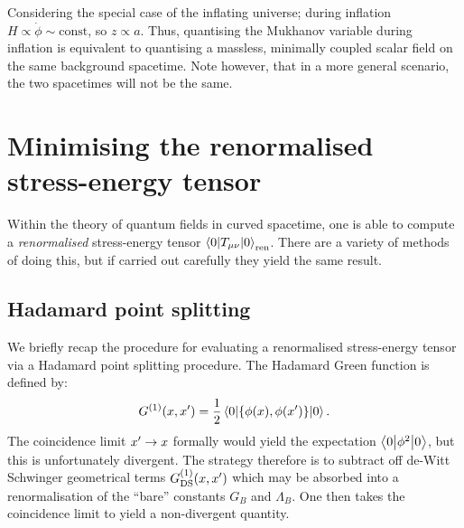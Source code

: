Considering the special case of the inflating universe; during inflation \(H\propto\dot{\phi}\sim\mathrm{const}\), so \(z\propto a\). Thus, quantising the Mukhanov variable during inflation is equivalent to quantising a massless, minimally coupled scalar field on the same background spacetime. Note however, that in a more general scenario, the two spacetimes will not be the same.

\section[Minimising the renormalised SET]{Minimising the renormalised stress-energy tensor}
Within the theory of quantum fields in curved spacetime, one is able to compute a {\em renormalised\/} stress-energy tensor \(\left\langle0\middle|T_{\mu\nu}\middle|0\right\rangle_\mathrm{ren}\). There are a variety of methods of doing this, but if carried out carefully they yield the same result.

\subsection{Hadamard point splitting}
We briefly recap the procedure for evaluating a renormalised stress-energy tensor via a Hadamard point splitting procedure.  
The Hadamard Green function is defined by:
\begin{equation}
  G^{(1)}(x,{{x}^\prime}) =\frac{1}{2} \left\langle0\middle|\left\{ \phi(x),\phi({{x}^\prime}) \right\}\middle|0\right\rangle.
  \label{eqn:green_function}
\end{equation}
The coincidence limit \({{x}^\prime}\to x\) formally would yield the expectation \(\left\langle0\middle|\phi^2\middle|0\right\rangle\), but this is unfortunately divergent. The strategy therefore is to subtract off de-Witt Schwinger geometrical terms \(G^{(1)}_\mathrm{DS}(x,{{x}^\prime})\) which may be absorbed into a renormalisation of the ``bare'' constants \(G_B\) and \(\Lambda_B\). One then takes the coincidence limit to yield a non-divergent quantity. 


